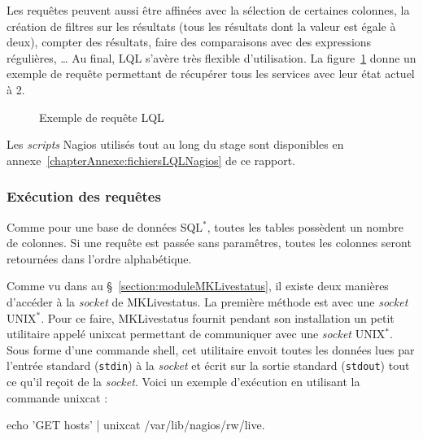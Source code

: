 \vspace{0.20cm}

Les requ\^etes peuvent aussi \^etre affin\'ees avec la s\'election de certaines colonnes, la cr\'eation de filtres sur les r\'esultats (tous les r\'esultats dont la valeur est \'egale \`a deux), compter des r\'esultats, faire des comparaisons avec des expressions r\'eguli\`eres, \ldots{}
Au final, LQL s'av\`ere tr\`es flexible d'utilisation.
La figure~\ref{code:exempleLQL} donne un exemple de requ\^ete permettant de r\'ecup\'erer tous les services avec leur \'etat actuel \`a 2.

\clearpage

\begin{figure}[!ht]
	
	\caption{Exemple de requ\^ete LQL}
	\label{code:exempleLQL}

\end{figure}

Les \textit{scripts} Nagios utilis\'es tout au long du stage sont disponibles en annexe~\ref{chapterAnnexe:fichiersLQLNagios} de ce rapport.

\subsubsection{Ex\'ecution des requ\^etes}

Comme pour une base de donn\'ees SQL$^*$, toutes les tables poss\`edent un nombre de colonnes.
Si une requ\^ete est pass\'ee sans param\^etres, toutes les colonnes seront retourn\'ees dans l'ordre alphab\'etique.

Comme vu dans au \S~\ref{section:moduleMKLivestatus}, il existe deux mani\`eres d'acc\'eder \`a la \textit{socket} de MKLivestatus.
La premi\`ere m\'ethode est avec une \textit{socket} UNIX$^*$. 
Pour ce faire, MKLivestatus fournit pendant son installation un petit utilitaire appel\'e \textsf{unixcat} permettant de communiquer avec une \textit{socket} UNIX$^*$.
Sous forme d'une commande shell, cet utilitaire envoit toutes les donn\'ees lues par l'entr\'ee standard (\texttt{stdin}) \`a la \textit{socket} et \'ecrit sur la sortie standard (\texttt{stdout}) tout ce qu'il re\c{c}oit de la \textit{socket}.
Voici un exemple d'ex\'ecution en utilisant la commande \textsf{unixcat} : 

\begin{center}
	\textsf{echo 'GET hosts' | unixcat /var/lib/nagios/rw/live}.

\end{center}

